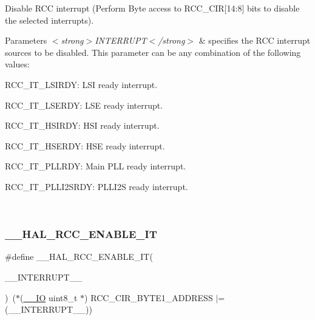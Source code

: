 Disable R\+CC interrupt (Perform Byte access to R\+C\+C\+\_\+\+C\+IR\mbox{[}14\+:8\mbox{]} bits to disable the selected interrupts). 


\begin{DoxyParams}{Parameters}
{\em $<$strong$>$\+I\+N\+T\+E\+R\+R\+U\+P\+T$<$/strong$>$} & specifies the R\+CC interrupt sources to be disabled. This parameter can be any combination of the following values\+: \begin{DoxyItemize}
\item R\+C\+C\+\_\+\+I\+T\+\_\+\+L\+S\+I\+R\+DY\+: L\+SI ready interrupt. \item R\+C\+C\+\_\+\+I\+T\+\_\+\+L\+S\+E\+R\+DY\+: L\+SE ready interrupt. \item R\+C\+C\+\_\+\+I\+T\+\_\+\+H\+S\+I\+R\+DY\+: H\+SI ready interrupt. \item R\+C\+C\+\_\+\+I\+T\+\_\+\+H\+S\+E\+R\+DY\+: H\+SE ready interrupt. \item R\+C\+C\+\_\+\+I\+T\+\_\+\+P\+L\+L\+R\+DY\+: Main P\+LL ready interrupt. \item R\+C\+C\+\_\+\+I\+T\+\_\+\+P\+L\+L\+I2\+S\+R\+DY\+: P\+L\+L\+I2S ready interrupt. \end{DoxyItemize}
\\
\hline
\end{DoxyParams}
\mbox{\label{group___r_c_c___flags___interrupts___management_ga180fb20a37b31a6e4f7e59213a6c0405}} 
\subsubsection{\texorpdfstring{\_\_HAL\_RCC\_ENABLE\_IT}{\_\_HAL\_RCC\_ENABLE\_IT}}
{\footnotesize\ttfamily \#define \+\_\+\+\_\+\+H\+A\+L\+\_\+\+R\+C\+C\+\_\+\+E\+N\+A\+B\+L\+E\+\_\+\+IT(\begin{DoxyParamCaption}\item[{}]{\+\_\+\+\_\+\+I\+N\+T\+E\+R\+R\+U\+P\+T\+\_\+\+\_\+ }\end{DoxyParamCaption})~($\ast$(\mbox{\hyperlink{core__sc300_8h_aec43007d9998a0a0e01faede4133d6be}{\+\_\+\+\_\+\+IO}} uint8\+\_\+t $\ast$) R\+C\+C\+\_\+\+C\+I\+R\+\_\+\+B\+Y\+T\+E1\+\_\+\+A\+D\+D\+R\+E\+SS $\vert$= (\+\_\+\+\_\+\+I\+N\+T\+E\+R\+R\+U\+P\+T\+\_\+\+\_\+))}



